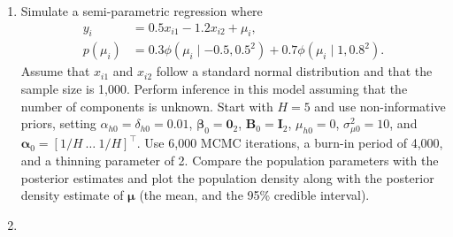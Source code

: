\begin{enumerate}
	\item Simulate a semi-parametric regression where  
	\begin{align*}
		y_i &= 0.5x_{i1} - 1.2x_{i2} + \mu_i, \\
		p(\mu_i) &= 
		0.3 \phi(\mu_i \mid -0.5,0.5^2) + 0.7 \phi(\mu_i \mid 1,0.8^2).		
	\end{align*}
	Assume that $x_{i1}$ and $x_{i2}$ follow a standard normal distribution and that the sample size is 1,000. Perform inference in this model assuming that the number of components is unknown. Start with $H=5$ and use non-informative priors, setting $\alpha_{h0}=\delta_{h0}=0.01$, $\bm{\beta}_0=\bm{0}_2$, $\bm{B}_0=\bm{I}_2$, $\mu_{h0}=0$, $\sigma^2_{\mu 0}=10$, and $\bm{\alpha}_0=[1/H \ \dots \ 1/H]^{\top}$. Use 6,000 MCMC iterations, a burn-in period of 4,000, and a thinning parameter of 2. Compare the population parameters with the posterior estimates and plot the population density along with the posterior density estimate of $\bm{\mu}$ (the mean, and the 95\% credible interval).
	
	\item 
	

  
\end{enumerate}

